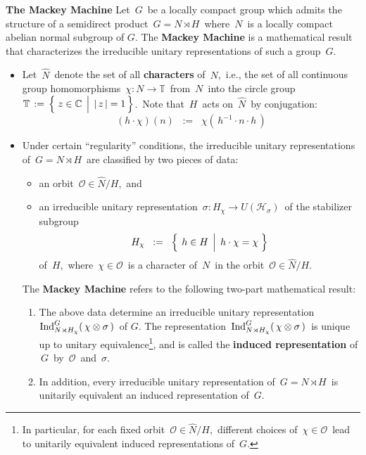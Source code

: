 \vskip 0.2cm
\noindent
\textbf{The Mackey Machine}
\vskip 0.2cm
Let \,$G$\, be a locally compact group which admits the structure of a semidirect product
\,$G = N \rtimes H$\,
where \,$N$\, is a locally compact abelian normal subgroup of $G$.
The \textbf{Mackey Machine} is a mathematical result that characterizes
the irreducible unitary representations of such a group \,$G$.\,
\begin{itemize}
\item
	Let
	\,$\widehat{N}$\,
	denote the set of all \textbf{characters} of \,$N$,\,
	i.e., the set of all continuous group homomorphisms
	\,$\chi : N \longrightarrow \mathbb{T}$\,
	from \,$N$\, into the circle group
	\,$\mathbb{T} \,:=\, \left\{\,
		\left.
		z \overset{{\color{white}.}}{\in} \C
		\,\;\right\vert\;
		\vert\,z\,\vert = 1
		\,\right\}$.\,
	Note that \,$H$\, acts on \,$\widehat{N}$\, by conjugation:
	\begin{equation*}
	(h\cdot\chi)(n)
	\;\; := \;\;
		\chi\!\left(\,h^{-1}\cdot n \cdot h\,\right)
	\end{equation*}
\item
	Under certain ``regularity'' conditions, the irreducible unitary representations of
	\,$G = N \rtimes H$\,
	are classified by two pieces of data:
	\begin{itemize}
	\item
		an orbit \,$\mathcal{O} \in \widehat{N} / H$,\, and
	\item
		an irreducible unitary representation
		\,$\sigma : H_{\chi} \longrightarrow U(\mathcal{H}_{\sigma})$\,
		of the stabilizer subgroup
		\begin{equation*}
		H_{\chi}
		\;\; := \;\;
			\left\{\;
				\left.
				h \overset{{\color{white}.}}{\in} H
				\;\,\right\vert\;
				h \cdot \chi = \chi
				\;\right\}
		\end{equation*}
		of \,$H$,\, where \,$\chi \in \mathcal{O}$\, is a character of \,$N$\,
		in the orbit \,$\mathcal{O} \in \widehat{N}/H$.\,
	\end{itemize}
	The \textbf{Mackey Machine} refers to the following two-part mathematical result:
	\begin{enumerate}
	\item
		\renewcommand{\thefootnote}{$\dagger$}
		The above data determine an irreducible unitary representation
		\,$\textnormal{Ind}^{G}_{N \rtimes H_{\chi}}(\,\chi\otimes\sigma\,)$\,
		of $G$.
		The representation
		\,$\textnormal{Ind}^{G}_{N \rtimes H_{\chi}}(\,\chi\otimes\sigma\,)$\, is unique up to
		unitary equivalence\footnote{In particular,
		for each fixed orbit \,$\mathcal{O} \in \widehat{N}/H$,\,
		different choices of \,$\chi \in \mathcal{O}$\,
		lead to unitarily equivalent induced representations of \,$G$.},
		and is called the
		\textbf{induced representation} of \,$G$\, by \,$\mathcal{O}$\, and \,$\sigma$.\,
	\item
		In addition, every irreducible unitary representation of
		\,$G = N \rtimes H$\,
		is unitarily equivalent an induced representation of \,$G$.\,
	\end{enumerate}
	\vskip 0.1cm
\end{itemize}


